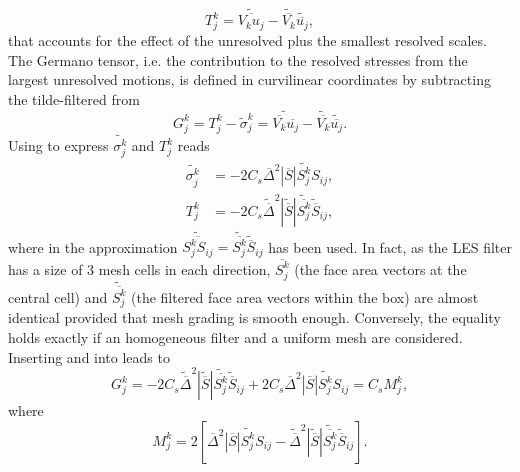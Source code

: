 \begin{equation}
	T_j^k = \widetilde{\overline{V_ku_j}} - \widetilde{\overline{V_k}}\widetilde{\overline{u_j}}, \label{eq:lesmodel_5}
\end{equation}
that accounts for the effect of the unresolved plus the smallest resolved scales. The Germano tensor, i.e. the contribution to the resolved stresses from the largest unresolved motions, is defined in curvilinear coordinates by subtracting the tilde-filtered  from 
\begin{equation}
	G_j^k = T_j^k - \widetilde{\sigma}_j^k = \widetilde{\overline{V_k}\overline{u_j}} - \widetilde{\overline{V_k}}\widetilde{\overline{u_j}} . \label{eq:lesmodel_6}
\end{equation}
Using  to express $\widetilde{\sigma_j^k}$ and $T_j^k$ reads
\begin{align}
	\widetilde{\sigma_j^k} &= -2C_s\overline{\Delta}^2\widetilde{\mathit{|\overline{S}|S_j^kS_{ij}}} \label{eq:lesmodel_7}, \\
	T_j^k &= -2C_s\widetilde{\overline{\Delta}}^2|\widetilde{\overline{S}}|\widetilde{\overline{S_j^k}}\widetilde{\overline{S}}_{ij}, \label{eq:lesmodel_8}
\end{align}
where in  the approximation $\widetilde{\overline{S_j^kS_{ij}}} = \widetilde{\overline{S_j^k}}\widetilde{\overline{S}}_{ij}$ has been used. In fact,  as the LES filter has a size of 3 mesh cells in each
direction, $\overline{S_j^k}$ (the face area vectors at the central cell) and
$\widetilde{\overline{S_j^k}}$ (the filtered face area vectors within the box)
are almost identical provided that mesh grading is smooth enough. Conversely, the equality holds exactly if an homogeneous filter and a uniform mesh are considered. Inserting  and  into  leads to
\begin{equation}
	G_j^k = -2C_s\widetilde{\overline{\Delta}}^2|\widetilde{\overline{S}}|\widetilde{\overline{S_j^k}}\widetilde{\overline{S}}_{ij} + 2C_s\overline{\Delta}^2\widetilde{\mathit{|\overline{S}|S_j^kS_{ij}}} = C_s M_j^k,
\end{equation}
where
\begin{equation}
	M_j^k = 2\left[ \overline{\Delta}^2\widetilde{\mathit{|\overline{S}|S_j^kS_{ij}}} - \widetilde{\overline{\Delta}}^2|\widetilde{\overline{S}}|\widetilde{\overline{S_j^k}}\widetilde{\overline{S}}_{ij}\right]. \label{eq:lesmodel_9}
\end{equation}
